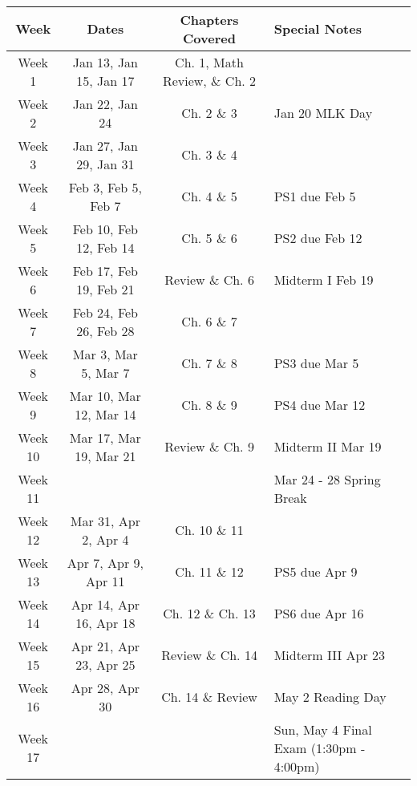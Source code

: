 \documentclass[11pt]{article}
\begin{document}
\newpage
{}\\

\begin{tabularx}{\textwidth}{|c|c|c|X|}
    \hline
    \textbf{Week} & \textbf{Dates} & \textbf{Chapters Covered} & \textbf{Special Notes} \\
    \hline
    Week 1 & Jan 13, Jan 15, Jan 17 & Ch. 1, Math Review, \& Ch. 2 & \\
    \hline
    Week 2 & Jan 22, Jan 24 & Ch. 2 \& 3 & Jan 20 MLK Day\\
    \hline
    Week 3 & Jan 27, Jan 29, Jan 31 & Ch. 3 \& 4 & \\
    \hline
    Week 4 & Feb 3, Feb 5, Feb 7 & Ch. 4 \& 5 & PS1 due Feb 5 \\
    \hline
	Week 5 & Feb 10, Feb 12, Feb 14 & Ch. 5 \& 6 & PS2 due Feb 12\\
    \hline
    Week 6 & Feb 17, Feb 19, Feb 21 & Review \& Ch. 6 & Midterm I Feb 19 \\
    \hline
    Week 7 & Feb 24, Feb 26, Feb 28 & Ch. 6 \& 7 & \\
    \hline
    Week 8 & Mar 3, Mar 5, Mar 7 & Ch. 7 \& 8 & PS3 due Mar 5 \\
    \hline
	Week 9 & Mar 10, Mar 12, Mar 14 & Ch. 8 \& 9 & PS4 due Mar 12 \\
    \hline
	Week 10 & Mar 17, Mar 19, Mar 21 & Review \& Ch. 9 & Midterm II Mar 19\\
    \hline
	Week 11 & & & Mar 24 - 28 Spring Break\\
    \hline
	Week 12 & Mar 31, Apr 2, Apr 4 & Ch. 10 \& 11 & \\
    \hline
	Week 13 & Apr 7, Apr 9, Apr 11 & Ch. 11 \& 12 & PS5 due Apr 9 \\
    \hline
	Week 14 & Apr 14, Apr 16, Apr 18 & Ch. 12 \& Ch. 13 & PS6 due Apr 16 \\
    \hline
	Week 15 & Apr 21, Apr 23, Apr 25 & Review \& Ch. 14 & Midterm III Apr 23\\
    \hline
	Week 16 & Apr 28, Apr 30 & Ch. 14 \& Review & May 2 Reading Day\\
    \hline
	Week 17 & & & Sun, May 4 Final Exam (1:30pm - 4:00pm)\\
    \hline
\end{tabularx}

\newpage
\medskip{}\\
\end{document}
